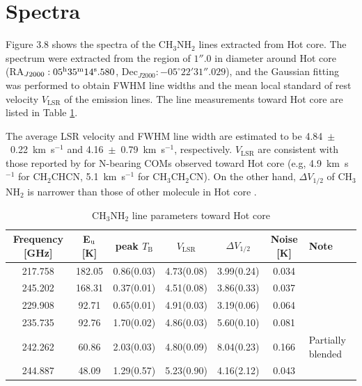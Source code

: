 \newpage
\section{Spectra}
Figure 3.8 shows the spectra of the CH$_3$NH$_2$ lines extracted from Hot core.
The spectrum were extracted from the region of $1''.0$ in diameter around 
Hot core (RA$_{J2000}: 05^{\rm{h}}35^{\rm{m}}14^{\rm{s}}.580$, Dec$_{J2000}:-05^{\circ}22'31''.029$), 
and the Gaussian fitting was performed to obtain FWHM line widths and the mean local standard of 
rest velocity $V_{\mathrm{LSR}}$ of the emission lines.
The line measurements toward Hot core are listed in Table \ref{tab:paraOri}.


The average LSR velocity and FWHM line width are estimated to be 4.84~$\pm$~0.22~km~s$^{-1}$ and 
4.16~$\pm$~0.79~km~s$^{-1}$, respectively.
 $V_{\mathrm{LSR}}$ are consistent with those reported by \citet{Feng+2015} 
 for N-bearing COMs observed toward Hot core
 (e.g, 4.9~km~s$^{-1}$ for CH$_2$CHCN, 5.1~km~s$^{-1}$ for CH$_3$CH$_2$CN).
On the other hand, $\Delta V_{1/2}$ of CH$_3$NH$_2$ is narrower than those of other molecule in Hot core
\citep[typically 5--15~km~s$^{-1}$,][]{Pagani+2017}.

\renewcommand{\arraystretch}{1.5}
\begin{table}[htb]
\begin{center}

  \caption{CH$_3$NH$_2$ line parameters toward Hot core}
  \label{tab:paraOri}
{\scriptsize
  \begin{tabular}{ccccccl} \hline
   Frequency [GHz]& E$_{\rm{u}}$ [K] &  peak $T_{\mathrm{B}}$\footnotemark[1] [K] & $V_{\mathrm{LSR}}$\footnotemark[1] [km s$^{-1}$] & $\Delta V_{1/2}$\footnotemark[1] [km s$^{-1}$] & Noise [K]  & Note \\ \hline 
    217.758  & 182.05 &  0.86(0.03) & 4.73(0.08) & 3.99(0.24) & 0.034 & \\
    245.202 & 168.31 & 0.37(0.01) & 4.51(0.08) & 3.86(0.33) & 0.037 & \\
    229.908  & 92.71 &  0.65(0.01) & 4.91(0.03) & 3.19(0.06)& 0.064&\\ 
    235.735  & 92.76 & 1.70(0.02) & 4.86(0.03) & 5.60(0.10)& 0.081 & \\
    242.262  & 60.86 &  2.03(0.03) & 4.80(0.09) & 8.04(0.23) & 0.166 & Partially blended \\
    244.887  & 48.09 & 1.29(0.57)& 5.23(0.90) & 4.16(2.12) & 0.043 & \\ \hline
  \end{tabular}
  }
\end{center}
\end{table}

